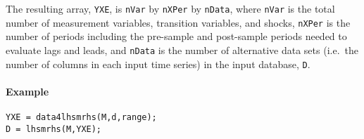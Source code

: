 The resulting array, \texttt{YXE}, is \texttt{nVar} by \texttt{nXPer} by
\texttt{nData}, where \texttt{nVar} is the total number of measurement
variables, transition variables, and shocks, \texttt{nXPer} is the
number of periods including the pre-sample and post-sample periods
needed to evaluate lags and leads, and \texttt{nData} is the number of
alternative data sets (i.e.~the number of columns in each input time
series) in the input database, \texttt{D}.

\paragraph{Example}

\begin{verbatim}
YXE = data4lhsmrhs(M,d,range);
D = lhsmrhs(M,YXE);
\end{verbatim}


